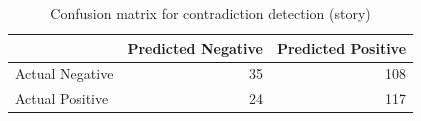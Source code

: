 \begin{table}
\caption{Confusion matrix for contradiction detection (story)}
\label{tab:confusion_matrix}
\begin{tabular}{lrr}
\toprule
 & Predicted Negative & Predicted Positive \\
\midrule
Actual Negative & 35 & 108 \\
Actual Positive & 24 & 117 \\
\bottomrule
\end{tabular}
\end{table}

